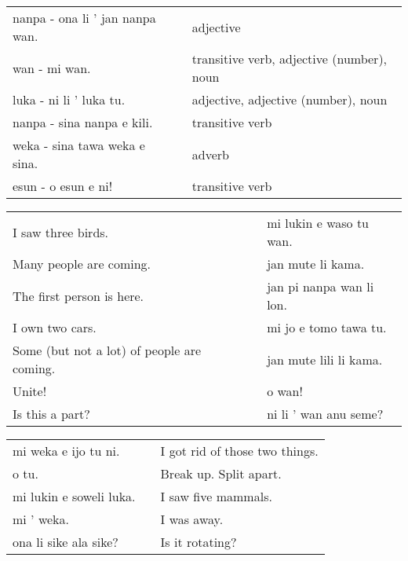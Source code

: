 \begin{supertabular}{p{5,5cm}|ll}
    nanpa - ona li ' jan nanpa wan. &  & adjective                                 \\
    wan - mi wan.                   &  & transitive verb, adjective (number), noun \\
    luka - ni li ' luka tu.         &  & adjective, adjective (number), noun       \\
    nanpa - sina nanpa e kili.      &  & transitive verb                           \\
    weka - sina tawa weka e sina.   &  & adverb                                    \\
    esun - o esun e ni!             &  & transitive verb                           \\
\end{supertabular}

\begin{supertabular}{p{5,5cm}|ll}
    I saw three birds.                         &  & mi lukin e waso tu wan.  \\
    Many people are coming.                    &  & jan mute li kama.        \\
    The first person is here.                  &  & jan pi nanpa wan li lon. \\
    I own two cars.                            &  & mi jo e tomo tawa tu.    \\
    Some (but not a lot) of people are coming. &  & jan mute lili li kama.   \\
    Unite!                                     &  & o wan!                   \\
    Is this a part?                            &  & ni li ' wan anu seme?    \\
\end{supertabular}

\begin{supertabular}{p{5,5cm}|ll}
    mi weka e ijo tu ni.    &  & I got rid of those two things. \\
    o tu.                   &  & Break up. Split apart.         \\
    mi lukin e soweli luka. &  & I saw five mammals.            \\
    mi ' weka.              &  & I was away.                    \\
    ona li sike ala sike?   &  & Is it rotating?                \\
\end{supertabular}

